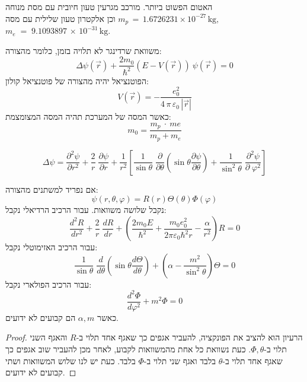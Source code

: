 \documentclass{tstextbook}
\begin{document}
\begin{definition}
האטום הפשוט ביותר. מורכב מגרעין טעון חיובית עם מסת מנוחה \(m_{p}\,=\,1.6726231\times10^{-27}\,\mathrm{kg},\) וכן אלקטרון טעון שלילית עם מסה \(m_{e}\;=\;9.1093897\,\times\,10^{-31}\,\mathrm{kg}\).

\end{definition}
\begin{proposition}
משוואת שרדינגר לא תלויה בזמן, כלומר מהצורה:
$$\Delta\psi\left(\vec{r}\right)+\frac{2m_{0}}{\hbar^{2}}\left(E-V\left(\vec{r}\right)\right)\ \psi\left(\vec{r}\right)=0$$
הפוטנציאל יהיה מהצורה של פוטנציאל קולון:
$$V\left(\vec{r}\right)=-\frac{e_{0}^{2}}{4\,\pi\,\varepsilon_{0}\,\left|\vec{r}\right|}$$
כאשר המסה של המערכת תהיה המסה המצומצמת:
$$m_{0}=\frac{m_{p}\ \cdot\ m e}{m_{p}+m_{e}}$$

\end{proposition}
\begin{reminder}
$$\Delta\psi=\frac{\partial^{2}\psi}{\partial r^{2}}+\frac{2}{r}\;\frac{\partial\psi}{\partial r}+\frac{1}{r^{2}}\left[\frac{1}{\sin\theta}\;\frac{\partial}{\partial\theta}\left(\sin\theta\frac{\partial\psi}{\partial\theta}\right)+\frac{1}{\sin^{2}\theta}\;\frac{\partial^{2}\psi}{\partial\;\varphi^{2}}\right]$$

\end{reminder}
\begin{proposition}
אם נפריד למשתנים מהצורה:
$$\psi\left(r,\theta,\varphi\right)=R\left(r\right)\Theta\left(\theta\right)\Phi\left(\varphi\right)$$
נקבל שלושה משוואות. עבור הרכיב הרדיאלי נקבל:
$${\frac{d^{2}R}{d r^{2}}}+{\frac{2}{r}}\;{\frac{d R}{d r}}+\left({\frac{2m_{0}E}{\hbar^{2}}}+{\frac{m_{0}e_{0}^{2}}{2\pi\varepsilon_{0}\hbar^{2}r}}-{\frac{\alpha}{r^{2}}}\right)R=0$$
עבור הרכיב האזימוטלי נקבל:
$${\frac{1}{\sin\theta}}\;{\frac{d}{d\theta}}\left(\sin\theta{\frac{d\Theta}{d\theta}}\right)+\left(\alpha-{\frac{m^{2}}{\sin^{2}\theta}}\right)\Theta=0$$
עבור הרכיב הפולארי נקבל:
$$\frac{d^{2}\Phi}{d\varphi^{2}}+m^{2}\Phi=0$$
כאשר \(\alpha,m\) הם קבועים לא ידועים.

\end{proposition}
\begin{proof}
הרעיון הוא להציב את הפונקציה, להעביר אגפים כך שאגף אחד תלוי ב-\(R\) והאגף השני תלוי ב-\(\Phi,\theta\).  כעת נשוואת כל אחת מהמשוואות לקבוע, לאחר מכן להעביר שוב אגפים כך שאגף אחד תלוי ב-\(\theta\) בלבד ואגף שני תלוי ב-\(\Phi\) בלבד. כעת יש לנו שלוש המשוואות ושתי קבועים לא ידועים.

\end{proof}
\end{document}
